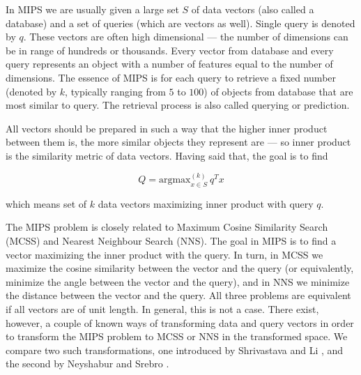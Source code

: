 In MIPS we are usually given a large set $S$ of data vectors (also called a database) and a set of queries
(which are vectors as well). Single query is denoted by $q$.
These vectors are often high dimensional --- the number of dimensions can be in range of hundreds or thousands.
Every vector from database and every query represents an object with a number of features equal to the number of dimensions.
The essence of MIPS is for each query to retrieve a fixed number (denoted by $k$, typically ranging
from $5$ to $100$)
of objects from database that are most similar to query.
The retrieval process is also called querying or prediction.

All vectors should be prepared in such a way that the higher inner product between them is, 
the more similar objects they represent are
 --- so inner product is the similarity metric of data vectors. 
Having said that, the goal is to find

$$ Q = \text{argmax}_{x \in S}^{(k)} \ q^T x $$

which means set of $k$ data vectors maximizing inner product with query $q$.

The MIPS problem is closely related to Maximum Cosine
Similarity Search (MCSS) and Nearest Neighbour Search (NNS).
The goal in MIPS is to find a vector maximizing the inner product with the query. In turn, 
in MCSS we maximize the cosine similarity between the vector and the query (or equivalently,
minimize the angle between the vector and the query), and in NNS we minimize the distance between the vector and the query. All three problems are
equivalent if all vectors are of unit length. In general, this is not a case.
There exist, however, a couple of known ways
of transforming data and query vectors in order to transform the MIPS problem to MCSS or NNS in the transformed space. We compare two such 
transformations, one introduced by Shrivastava and Li \cite{alsh}, and the second by
Neyshabur and Srebro \cite{neyshabur}.

